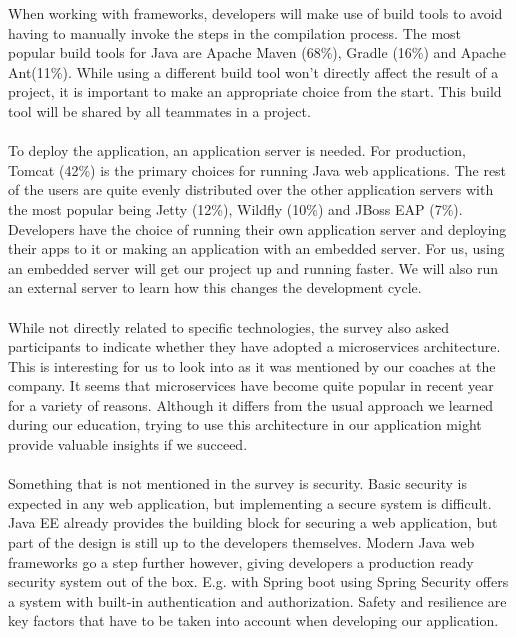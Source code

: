 \documentclass[12pt]{article}
\begin{document}
When working with frameworks, developers will make use of build tools to avoid having to manually invoke the steps in the compilation process. The most popular build tools for Java are Apache Maven (68\%), Gradle (16\%) and Apache Ant(11\%). While using a different build tool won't directly affect the result of a project, it is important to make an appropriate choice from the start. This build tool will be shared by all teammates in a project. 
\\\\
To deploy the application, an application server is needed. For production, Tomcat (42\%) is the primary choices for running Java web applications. The rest of the users are quite evenly distributed over the other application servers with the most popular being Jetty (12\%), Wildfly (10\%) and JBoss EAP (7\%). Developers have the choice of running their own application server and deploying their apps to it or making an application with an embedded server. For us, using an embedded server will get our project up and running faster. We will also run an external server to learn how this changes the development cycle. 
\\\\
While not directly related to specific technologies, the survey also asked participants to indicate whether they have adopted a microservices architecture. This is interesting for us to look into as it was mentioned by our coaches at the company. It seems that microservices have become quite popular in recent year for a variety of reasons.\cite{WhyMicroservices48:online} Although it differs from the usual approach we learned during our education, trying to use this architecture in our application might provide valuable insights if we succeed.  
\\\\
Something that is not mentioned in the survey is security. Basic security is expected in any web application, but implementing a secure system is difficult. Java EE already provides the building block for securing a web application, but part of the design is still up to the developers themselves.\cite{JavaEESecurity29:online} Modern Java web frameworks go a step further however, giving developers a production ready security system out of the box. E.g. with Spring boot using Spring Security offers a system with built-in authentication and authorization. Safety and resilience are key factors that have to be taken into account when developing our application.
\\\\
\end{document}
